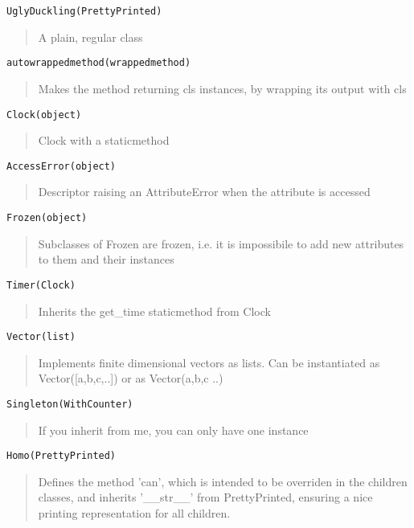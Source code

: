 \documentclass[10pt,english]{article}
\begin{document}
\texttt{UglyDuckling(PrettyPrinted)}
\begin{quote}

A plain, regular class
\end{quote}

\texttt{autowrappedmethod(wrappedmethod)}
\begin{quote}

Makes the method returning cls instances, by wrapping its
output with cls
\end{quote}

\texttt{Clock(object)}
\begin{quote}

Clock with a staticmethod
\end{quote}

\texttt{AccessError(object)}
\begin{quote}

Descriptor raising an AttributeError when the attribute is 
accessed
\end{quote}

\texttt{Frozen(object)}
\begin{quote}

Subclasses of Frozen are frozen, i.e. it is impossibile to add
new attributes to them and their instances
\end{quote}

\texttt{Timer(Clock)}
\begin{quote}

Inherits the get{\_}time staticmethod from Clock
\end{quote}

\texttt{Vector(list)}
\begin{quote}

Implements finite dimensional vectors as lists. Can be instantiated
as Vector([a,b,c,..]) or as Vector(a,b,c ..)
\end{quote}

\texttt{Singleton(WithCounter)}
\begin{quote}

If you inherit from me, you can only have one instance
\end{quote}

\texttt{Homo(PrettyPrinted)}
\begin{quote}

Defines the method 'can', which is intended to be overriden 
in the children classes, and inherits '{\_}{\_}str{\_}{\_}' from PrettyPrinted,
ensuring a nice printing representation for all children.
\end{quote}
\end{document}
